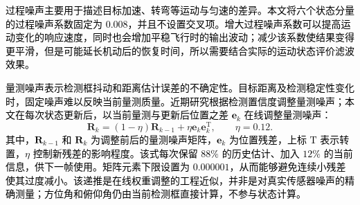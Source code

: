\textcolor{black}{过程噪声主要用于描述目标加速、转弯等运动与匀速的差异。本文将六个状态分量的过程噪声系数固定为 $0.008$，并且不设置交叉项。增大过程噪声系数可以提高运动变化的响应速度，同时也会增加平稳飞行时的输出波动；减少该系数使结果变得更平滑，但是可能延长机动后的恢复时间，所以需要结合实际的运动状态评价滤波效果。}

\textcolor{black}{量测噪声表示检测框抖动和距离估计误差的不确定性。目标距离及检测稳定性变化时，固定噪声难以反映当前量测质量。近期研究根据检测置信度调整量测噪声\cite{adaptive_kf,adaptive_noise}；本文在每次状态更新后，以当前量测与更新后位置之差 $\mathbf e_k$ 在线调整量测噪声：}
\begin{equation}
\mathbf R_k=(1-\eta)\mathbf R_{k-1}+\eta\mathbf e_k\mathbf e_k^{\mathrm{T}},
\qquad \eta=0.12.
\label{eq:ch2_R_update}
\end{equation}
\textcolor{black}{其中，$\mathbf R_{k-1}$ 和 $\mathbf R_k$ 为调整前后的量测噪声矩阵，$\mathbf e_k$ 为位置残差，上标 $\mathrm{T}$ 表示转置，$\eta$ 控制新残差的影响程度。该式每次保留 $88\%$ 的历史估计、加入 $12\%$ 的当前信息，供下一帧使用。矩阵元素下限设置为 $0.000001$，从而能够避免连续小残差使其过度减小。该递推是在线权重调整的工程近似，并非是对真实传感器噪声的精确测量；方位角和俯仰角仍由当前检测框直接计算，不参与状态计算。}
